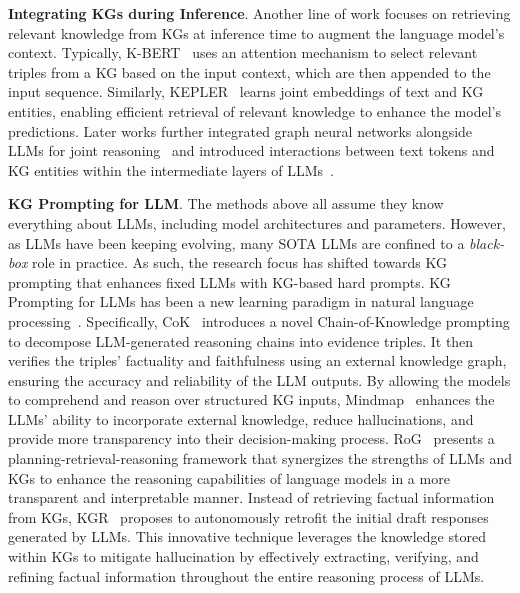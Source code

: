 \documentclass{article}
\theoremstyle{boldremark}
\begin{document}
{\bf Integrating KGs during Inference}.
Another line of work focuses on retrieving relevant knowledge from KGs at inference time to augment the language model's context. Typically, K-BERT~\cite{liu2020k} uses an attention mechanism to select relevant triples from a KG based on the input context, which are then appended to the input sequence. Similarly, KEPLER~\cite{wang2021kepler} learns joint embeddings of text and KG entities, enabling efficient retrieval of relevant knowledge to enhance the model's predictions.  Later works further integrated graph neural networks alongside LLMs for joint reasoning~\cite{QA-GNN,GreaseLM,dong2023hierarchy} and introduced interactions between text tokens and KG entities within the intermediate layers of LLMs~\cite{sun2021jointlk,taunk2023grapeqa}.

{\bf KG Prompting for LLM}. The methods above all assume they know everything about LLMs, including model architectures and parameters. However, as LLMs have been keeping evolving, many SOTA LLMs are confined to a \emph{black-box} role in practice. As such, the research focus has shifted towards KG prompting that enhances fixed LLMs with KG-based hard prompts. 
KG Prompting for LLMs has been a new learning paradigm in natural language processing~\cite{liu2023pre,pan2024unifying}. Specifically, CoK~\cite{wang2023boosting} introduces a novel Chain-of-Knowledge prompting to decompose LLM-generated reasoning chains into evidence triples. It then verifies the triples' factuality and faithfulness using an external knowledge graph, ensuring the accuracy and reliability of the LLM outputs. 
By allowing the models to comprehend and reason over structured KG inputs, Mindmap~\cite{wen2023mindmap} enhances the LLMs' ability to incorporate external knowledge, reduce hallucinations, and provide more transparency into their decision-making process. RoG~\cite{luo2023reasoning} presents a planning-retrieval-reasoning framework that synergizes the strengths of LLMs and KGs to enhance the reasoning capabilities of language models in a more transparent and interpretable manner. Instead of retrieving factual information from KGs, KGR~\cite{guan2024mitigating} proposes to autonomously retrofit the initial draft responses generated by LLMs. This innovative technique leverages the knowledge stored within KGs to mitigate hallucination by effectively extracting, verifying, and refining factual information throughout the entire reasoning process of LLMs.
\end{document}
